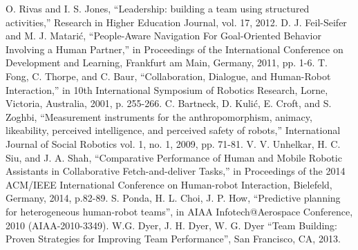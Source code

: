 \documentclass{acm_proc_article-sp}
\begin{document}
\begin{thebibliography}{}
 O. Rivas and I. S. Jones, ``Leadership: building a team using structured activities,'' Research in Higher Education Journal, vol. 17, 2012.
 D. J. Feil-Seifer and M. J. Matari\'{c}, ``People-Aware Navigation For Goal-Oriented Behavior Involving a Human Partner,'' in Proceedings of the International Conference on Development and Learning, Frankfurt am Main, Germany, 2011, pp. 1-6.
 T. Fong, C. Thorpe, and C. Baur, ``Collaboration, Dialogue, and Human-Robot Interaction,'' in 10th International Symposium of Robotics Research, Lorne, Victoria, Australia, 2001, p. 255-266.
 C. Bartneck, D. Kuli\'{c}, E. Croft, and S. Zoghbi, ``Measurement instruments for the anthropomorphism, animacy, likeability, perceived intelligence, and perceived safety of robots,'' International Journal of Social Robotics vol. 1, no. 1, 2009, pp. 71-81.
 V. V. Unhelkar, H. C. Siu, and J. A. Shah, ``Comparative Performance of Human and Mobile Robotic Assistants in Collaborative Fetch-and-deliver Tasks,'' in Proceedings of the 2014 ACM/IEEE International Conference on Human-robot Interaction, Bielefeld, Germany, 2014, p.82-89.
 S. Ponda, H. L. Choi, J. P. How, ``Predictive planning for heterogeneous human-robot teams'', in AIAA Infotech@Aerospace Conference, 2010 (AIAA-2010-3349).
 W.G. Dyer, J. H. Dyer, W. G. Dyer ``Team Building: Proven Strategies for Improving Team Performance'', San Francisco, CA, 2013.

\end{thebibliography}

\balancecolumns
\end{document}
